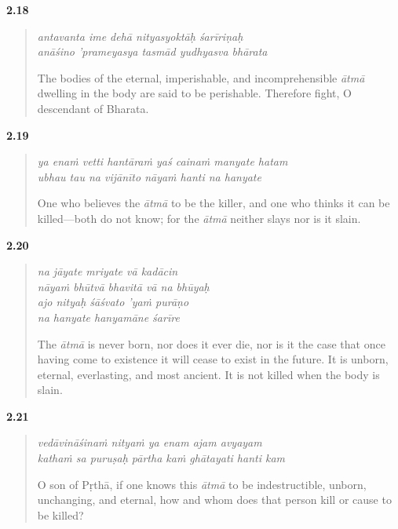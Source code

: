 \par\noindent\textbf{2.18}\par
\begin{verse}
\textit{antavanta ime dehā nityasyoktāḥ śarīriṇaḥ} \\
\textit{anāśino ’prameyasya tasmād yudhyasva bhārata}

\noindent The bodies of the eternal, imperishable, and incomprehensible \textit{ātmā} dwelling in the body are said to be perishable. Therefore fight, O descendant of Bharata.
\end{verse}
\par



\par\noindent\textbf{2.19}\par
\begin{verse}
\textit{ya enaṁ vetti hantāraṁ yaś cainaṁ manyate hatam} \\
\textit{ubhau tau na vijānīto nāyaṁ hanti na hanyate}

\noindent One who believes the \textit{ātmā} to be the killer, and one who thinks it can be killed---both do not know; for the \textit{ātmā} neither slays nor is it slain.
\end{verse}
\par



\par\noindent\textbf{2.20}\par
\begin{verse}
\textit{na jāyate mriyate vā kadācin} \\
\textit{nāyaṁ bhūtvā bhavitā vā na bhūyaḥ} \\
\textit{ajo nityaḥ śāśvato ’yaṁ purāṇo} \\
\textit{na hanyate hanyamāne śarīre}

\noindent The \textit{ātmā} is never born, nor does it ever die, nor is it the case that once having come to existence it will cease to exist in the future. It is unborn, eternal, everlasting, and most ancient. It is not killed when the body is slain.
\end{verse}
\par



\par\noindent\textbf{2.21}\par
\begin{verse}
\textit{vedāvināśinaṁ nityaṁ ya enam ajam avyayam} \\
\textit{kathaṁ sa puruṣaḥ pārtha kaṁ ghātayati hanti kam}

\noindent O son of Pṛthā, if one knows this \textit{ātmā} to be indestructible, unborn, unchanging, and eternal, how and whom does that person kill or cause to be killed?
\end{verse}
\par



